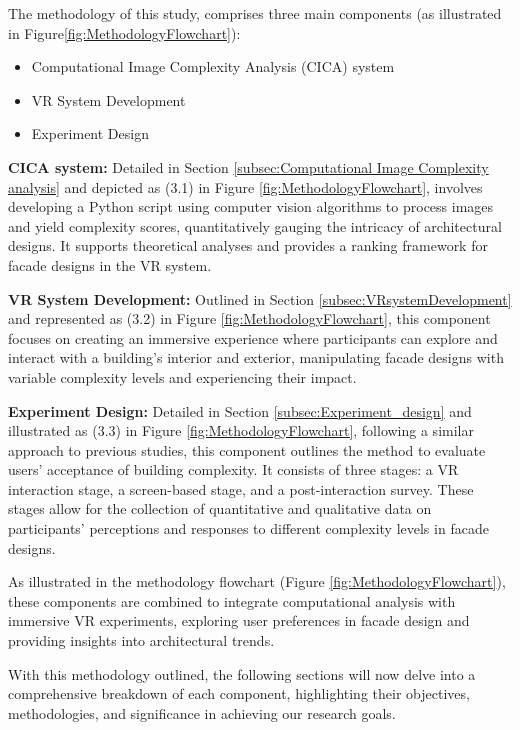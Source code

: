 The methodology of this study, comprises three main components (as illustrated in  Figure\ref{fig:MethodologyFlowchart}):

\begin{itemize}
    \item Computational Image Complexity Analysis (CICA) system
    \item VR System Development
    \item Experiment Design
\end{itemize}

\textbf{CICA system:} Detailed in Section \ref{subsec:Computational Image Complexity analysis} and depicted as (3.1) in Figure \ref{fig:MethodologyFlowchart}, involves developing a Python script using computer vision algorithms to process images and yield complexity scores, quantitatively gauging the intricacy of architectural designs.
It supports theoretical analyses and provides a ranking framework for facade designs in the VR system.

\textbf{VR System Development:}  Outlined in Section \ref{subsec:VRsystemDevelopment} and represented as (3.2) in Figure \ref{fig:MethodologyFlowchart}, this component focuses on creating an immersive experience where participants can explore and interact with a building's interior and exterior, manipulating facade designs with variable complexity levels and experiencing their impact.

\textbf{Experiment Design:} Detailed in Section \ref{subsec:Experiment_design} and illustrated as (3.3) in Figure \ref{fig:MethodologyFlowchart}, following a similar approach to previous studies\cite{Wolfartsberger2019}, this component outlines the method to evaluate users' acceptance of building complexity.
It consists of three stages: a VR interaction stage, a screen-based stage, and a post-interaction survey.
These stages allow for the collection of quantitative and qualitative data on participants' perceptions and responses to different complexity levels in facade designs.

As illustrated in the methodology flowchart (Figure \ref{fig:MethodologyFlowchart}), these components are combined to integrate computational analysis with immersive VR experiments, exploring user preferences in facade design and providing insights into architectural trends.

With this methodology outlined, the following sections will now delve into a comprehensive breakdown of each component, highlighting their objectives, methodologies, and significance in achieving our research goals.



